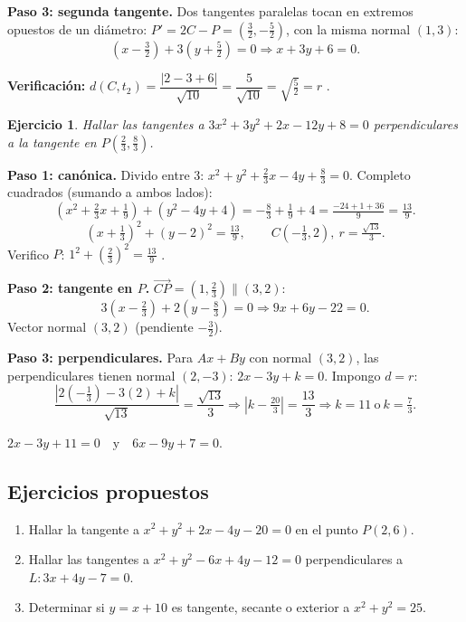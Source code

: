 \documentclass[11pt,a4paper]{article}
\theoremstyle{ej}
\newtheorem{ejercicio}{Ejercicio}[section]
\begin{document}
\textbf{Paso 3: segunda tangente.} Dos tangentes paralelas tocan en extremos opuestos de un diámetro:
$P'=2C-P=\left(\tfrac32,-\tfrac52\right)$, con la misma normal $(1,3)$:
\[ \left(x-\tfrac32\right)+3\left(y+\tfrac52\right)=0\Rightarrow \boxed{x+3y+6=0}. \]

\textbf{Verificación:} $d(C,t_2)=\dfrac{|2-3+6|}{\sqrt{10}}=\dfrac5{\sqrt{10}}=\sqrt{\tfrac52}=r$ \checkmark.

\begin{ejercicio}
Hallar las tangentes a $3x^2+3y^2+2x-12y+8=0$ perpendiculares a la tangente en $P\left(\tfrac23,\tfrac83\right)$.
\end{ejercicio}

\textbf{Paso 1: canónica.} Divido entre 3: $x^2+y^2+\tfrac23x-4y+\tfrac83=0$. Completo cuadrados
(sumando a ambos lados):
\[ \left(x^2+\tfrac23x+\tfrac19\right)+(y^2-4y+4)=-\tfrac83+\tfrac19+4=\tfrac{-24+1+36}{9}=\tfrac{13}9. \]
\[ \left(x+\tfrac13\right)^2+(y-2)^2=\tfrac{13}9,\qquad C\left(-\tfrac13,2\right),\ r=\tfrac{\sqrt{13}}3. \]
Verifico $P$: $1^2+\left(\tfrac23\right)^2=\tfrac{13}9$ \checkmark.

\textbf{Paso 2: tangente en $P$.} $\overrightarrow{CP}=\left(1,\tfrac23\right)\parallel(3,2)$:
\[ 3\left(x-\tfrac23\right)+2\left(y-\tfrac83\right)=0\Rightarrow 9x+6y-22=0. \]
Vector normal $(3,2)$ (pendiente $-\tfrac32$).

\textbf{Paso 3: perpendiculares.} Para $Ax+By$ con normal $(3,2)$, las perpendiculares tienen normal $(2,-3)$:
$2x-3y+k=0$. Impongo $d=r$:
\[
\frac{|2(-\tfrac13)-3(2)+k|}{\sqrt{13}}=\frac{\sqrt{13}}3\Rightarrow \left|k-\tfrac{20}3\right|=\frac{13}3
\Rightarrow k=11\ \text{o}\ k=\tfrac73.
\]
\begin{respuesta}
$2x-3y+11=0\quad\text{y}\quad 6x-9y+7=0.$
\end{respuesta}

\subsection{Ejercicios propuestos}

\begin{enumerate}[label=\textbf{P\arabic*.}]
  \item Hallar la tangente a $x^2+y^2+2x-4y-20=0$ en el punto $P(2,6)$.
  \item Hallar las tangentes a $x^2+y^2-6x+4y-12=0$ perpendiculares a $L:3x+4y-7=0$.
  \item Determinar si $y=x+10$ es tangente, secante o exterior a $x^2+y^2=25$.
\end{enumerate}
\end{document}
